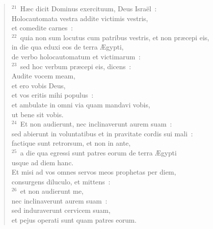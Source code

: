 \begin{flushleft}
\begin{verse}
${}^{21}$~H\ae c dicit Dominus exercituum, Deus Isra\"el~:\\ Holocautomata vestra addite victimis vestris,\\ et comedite carnes~:\\
${}^{22}$~quia non sum locutus cum patribus vestris, et non pr\ae cepi eis,\\ in die qua eduxi eos de terra \AE gypti,\\ de verbo holocautomatum et victimarum~:\\
${}^{23}$~sed hoc verbum pr\ae cepi eis, dicens~:\\ Audite vocem meam,\\ et ero vobis Deus,\\ et vos eritis mihi populus~:\\ et ambulate in omni via quam mandavi vobis,\\ ut bene sit vobis.\\
${}^{24}$~Et non audierunt, nec inclinaverunt aurem suam~:\\ sed abierunt in voluntatibus et in pravitate cordis sui mali~:\\ factique sunt retrorsum, et non in ante,\\
${}^{25}$~a die qua egressi sunt patres eorum de terra \AE gypti\\ usque ad diem hanc.\\ Et misi ad vos omnes servos meos prophetas per diem,\\ consurgens diluculo, et mittens~:\\
${}^{26}$~et non audierunt me,\\ nec inclinaverunt aurem suam~:\\ sed induraverunt cervicem suam,\\ et pejus operati sunt quam patres eorum.\end{verse}\end{flushleft}


